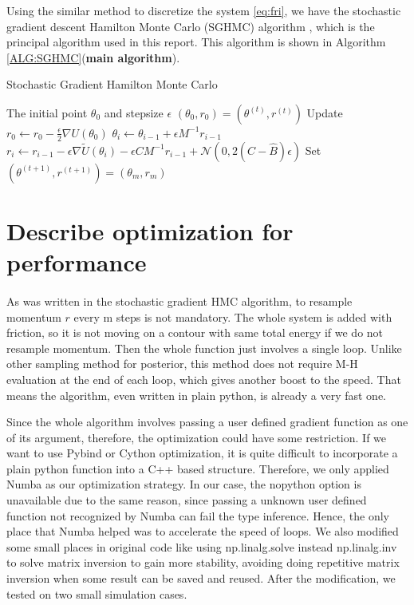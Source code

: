 \documentclass[11pt]{article}
\begin{document}
Using the similar method to discretize the system \eqref{eq:fri}, we have the stochastic gradient descent Hamilton Monte Carlo (SGHMC) algorithm \cite{chen2014stochastic}, which is the principal algorithm used in this report. This algorithm is shown in Algorithm \ref{ALG:SGHMC}(\textbf{main algorithm}).
\begin{algorithm}
	\caption{Stochastic Gradient Hamilton Monte Carlo}
	\label{ALG:SGHMC}
	\begin{algorithmic} 
		\REQUIRE The initial point $\theta_0$ and stepsize $\epsilon$
        \STATE $\left(\theta_{0}, r_{0}\right)=\left(\theta^{(t)}, r^{(t)}\right)$
        \STATE Update $r_{0} \leftarrow r_{0}-\frac{\epsilon}{2} \nabla U\left(\theta_{0}\right)$
            \STATE $\theta_{i} \leftarrow \theta_{i-1}+\epsilon M^{-1} r_{i-1}$
            \STATE $r_{i} \leftarrow r_{i-1}-\epsilon \nabla \tilde{U}\left(\theta_{i}\right)-\epsilon C M^{-1} r_{i-1}+\mathcal{N}\left(0,2(C-\hat{B}) \epsilon\right)$
        \ENDFOR
        \STATE Set $\left(\theta^{(t+1)}, r^{(t+1)}\right)=\left(\theta_{m}, r_{m}\right)$ 
		\ENDFOR
	\end{algorithmic}
\end{algorithm}

\newpage
\section{Describe optimization for performance}
\paragraph{}
As was written in the stochastic gradient HMC algorithm, to resample momentum $r$ every m steps is not mandatory. The whole system is added with friction, so it is not moving on a contour with same total energy if we do not resample momentum. Then the whole function just involves a single loop. Unlike other sampling method for posterior, this method does not require M-H evaluation at the end of each loop, which gives another boost to the speed. That means the algorithm, even written in plain python, is already a very fast one. 

Since the whole algorithm involves passing a user defined gradient function as one of its argument, therefore, the optimization could have some restriction. If we want to use Pybind \cite{moldovan2016pybinding} or Cython\cite{behnel2011cython} optimization, it is quite difficult to incorporate a plain python function into a C++ based structure. Therefore, we only applied Numba\cite{lam2015numba} as our optimization strategy. In our case, the nopython option is unavailable due to the same reason, since passing a unknown user defined function not recognized by Numba can fail the type inference. Hence, the only place that Numba helped was to accelerate the speed of loops.
We also modified some small places in original code like using np.linalg.solve  instead np.linalg.inv to solve matrix inversion to gain more stability, avoiding doing repetitive matrix inversion when some result can be saved and reused. After the modification, we tested on two small simulation cases. 
\end{document}
